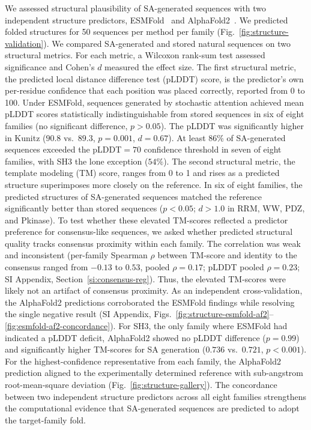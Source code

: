 We assessed structural plausibility of SA-generated sequences with two independent structure predictors, ESMFold~\cite{linEvolutionaryScaleModeling2023} and AlphaFold2~\cite{jumperHighlyAccurateProtein2021}. We predicted folded structures for 50 sequences per method per family (Fig.~\ref{fig:structure-validation}). We compared SA-generated and stored natural sequences on two structural metrics. For each metric, a Wilcoxon rank-sum test assessed significance and Cohen's $d$ measured the effect size. The first structural metric, the predicted local distance difference test (pLDDT) score, is the predictor's own per-residue confidence that each position was placed correctly, reported from 0 to 100. Under ESMFold, sequences generated by stochastic attention achieved mean pLDDT scores statistically indistinguishable from stored sequences in six of eight families (no significant difference, $p > 0.05$). The pLDDT was significantly higher in Kunitz ($90.8$ vs.\ $89.3$, $p{=}0.001$, $d{=}0.67$). At least 86\% of SA-generated sequences exceeded the pLDDT${=}70$ confidence threshold in seven of eight families, with SH3 the lone exception ($54\%$). The second structural metric, the template modeling (TM) score, ranges from 0 to 1 and rises as a predicted structure superimposes more closely on the reference. In six of eight families, the predicted structures of SA-generated sequences matched the reference significantly better than stored sequences ($p < 0.05$; $d > 1.0$ in RRM, WW, PDZ, and Pkinase). To test whether these elevated TM-scores reflected a predictor preference for consensus-like sequences, we asked whether predicted structural quality tracks consensus proximity within each family. The correlation was weak and inconsistent (per-family Spearman $\rho$ between TM-score and identity to the consensus ranged from $-0.13$ to $0.53$, pooled $\rho{=}0.17$; pLDDT pooled $\rho{=}0.23$; SI Appendix, Section~\ref{si:consensus-reg}). Thus, the elevated TM-scores were likely not an artifact of consensus proximity. As an independent cross-validation, the AlphaFold2 predictions corroborated the ESMFold findings while resolving the single negative result (SI Appendix, Figs.~\ref{fig:structure-esmfold-af2}--\ref{fig:esmfold-af2-concordance}). For SH3, the only family where ESMFold had indicated a pLDDT deficit, AlphaFold2 showed no pLDDT difference ($p{=}0.99$) and significantly higher TM-scores for SA generation ($0.736$ vs.\ $0.721$, $p < 0.001$). For the highest-confidence representative from each family, the AlphaFold2 prediction aligned to the experimentally determined reference with sub-angstrom root-mean-square deviation (Fig.~\ref{fig:structure-gallery}). The concordance between two independent structure predictors across all eight families strengthens the computational evidence that SA-generated sequences are predicted to adopt the target-family fold.

